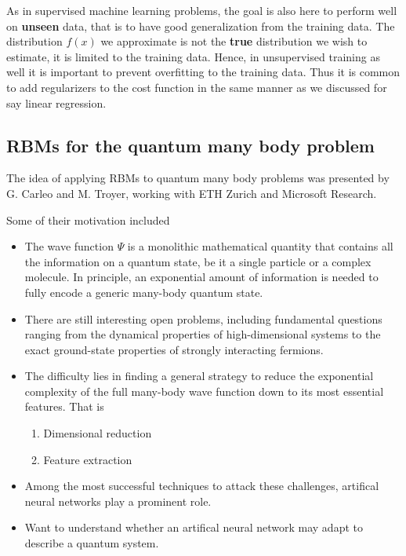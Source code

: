 \documentclass[%
oneside,                 %
final,                   %
10pt]{article}
\begin{document}
As in supervised machine learning problems, the goal is also here to
perform well on \textbf{unseen} data, that is to have good
generalization from the training data. The distribution $f(x)$ we
approximate is not the \textbf{true} distribution we wish to estimate,
it is limited to the training data. Hence, in unsupervised training as
well it is important to prevent overfitting to the training data. Thus
it is common to add regularizers to the cost function in the same
manner as we discussed for say linear regression.



\subsection{RBMs for the quantum many body problem}

The idea of applying RBMs to quantum many body problems was presented by G. Carleo and M. Troyer, working with ETH Zurich and Microsoft Research.

Some of their motivation included

\begin{itemize}
\item The wave function $\Psi$ is a monolithic mathematical quantity that contains all the information on a quantum state, be it a single particle or a complex molecule. In principle, an exponential amount of information is needed to fully encode a generic many-body quantum state.

\item There are still interesting open problems, including fundamental questions ranging from the dynamical properties of high-dimensional systems to the exact ground-state properties of strongly interacting fermions.

\item The difficulty lies in finding a general strategy to reduce the exponential complexity of the full many-body wave function down to its most essential features. That is
\begin{enumerate}

\item Dimensional reduction

\item Feature extraction

\end{enumerate}

\noindent
\item Among the most successful techniques to attack these challenges, artifical neural networks play a prominent role.

\item Want to understand whether an artifical neural network may adapt to describe a quantum system.
\end{itemize}
\end{document}
